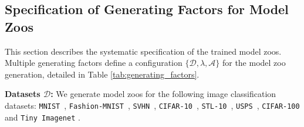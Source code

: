 %
%
\subsection{Specification of Generating Factors for Model Zoos}
This section describes the systematic specification of the trained model zoos. Multiple generating factors define a configuration $\{\mathcal{D}, \lambda, \mathcal{A}\}$ for the model zoo generation, detailed in Table \ref{tab:generating_factors}.

%
%
%
\textbf{Datasets $\mathcal{D}$:}
We generate model zoos for the following image classification datasets: \texttt{MNIST}~\citep{lecunGradientbasedLearningApplied1998}, \texttt{Fashion-MNIST}~\citep{xiaoFashionMNISTNovelImage2017}, \texttt{SVHN}~\citep{netzerReadingDigitsNatural2011}, \texttt{CIFAR-10}~\citep{krizhevskyLearningMultipleLayers2009},
\texttt{STL-10}~\citep{coatesAnalysisSingleLayerNetworks2011}, \texttt{USPS}~\citep{hullDatabaseHandwrittenText1994}, \texttt{CIFAR-100} \citep{krizhevskyLearningMultipleLayers2009} and \texttt{Tiny Imagenet} \citep{leTinyImageNetVisual}.
%
%
%
%


